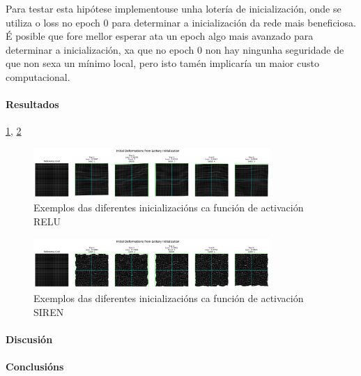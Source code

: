 Para testar esta hipótese implementouse unha lotería de inicialización, onde se utiliza o loss no epoch 0 para determinar a inicialización da rede mais beneficiosa.
É posible que fore mellor esperar ata un epoch algo mais avanzado para determinar a inicialización, xa que no epoch 0 non hay ningunha seguridade de que non sexa un mínimo local, pero isto tamén implicaría un maior custo computacional.

\paragraph{Resultados}
\label{par:Resultados}

\ref{fig:lottery_initial_deformations_combinedMLP}, \ref{fig:lottery_initial_deformations_combinedSIREN}

\begin{figure}[ht]
    \centering
    \includegraphics[width=0.8\textwidth]{imaxes/lottery/initial_deformations_combinedMLP.png}
    \caption{Exemplos das diferentes inicializacións ca función de activación RELU}
    \label{fig:lottery_initial_deformations_combinedMLP}
\end{figure}

\begin{figure}[ht]
    \centering
    \includegraphics[width=0.8\textwidth]{imaxes/lottery/initial_deformations_combinedSIREN.png}
    \caption{Exemplos das diferentes inicializacións ca función de activación SIREN}
    \label{fig:lottery_initial_deformations_combinedSIREN}
\end{figure}

\paragraph{Discusión}
\label{par:Discusión}

\paragraph{Conclusións}
\label{par:Conclusións}

